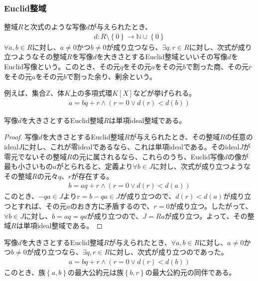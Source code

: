 \documentclass[dvipdfmx]{jsarticle}
\begin{document}
\subsubsection{Euclid整域}%
\begin{dfn} 整域$R$と次式のような写像$d$が与えられたとき、
\begin{align*}
d:R \setminus \left\{ 0 \right\} \rightarrow \mathbb{N} \cup \left\{ 0 \right\}
\end{align*}
$\forall a,b \in R$に対し、$a \neq 0$かつ$b \neq 0$が成り立つなら、$\exists q,r \in R$に対し、次式が成り立つようなその整域$R$を写像$d$を大きさとするEuclid整域といいその写像$d$をEuclid写像という。このとき、その元$q$をその元$a$をその元$b$で割った商、その元$r$をその元$a$をその元$b$で割った余り、剰余という。
\end{dfn}\par
例えば、集合$\mathbb{Z}$、体$K$上の多項式環$K[ X]$などが挙げられる。
\begin{align*}
a = bq + r \land \left( r = 0 \vee d(r) < d(b) \right)
\end{align*}
\begin{thm}\label{3.3.4.15}
写像$d$を大きさとするEuclid整域$R$は単項ideal整域である。
\end{thm}
\begin{proof}
写像$d$を大きさとするEuclid整域$R$が与えられたとき、その整域$R$の任意のideal$J$に対し、これが零idealであるなら、これは単項idealである。そのideal$J$が零元でないその整域$R$の元に属されるなら、これらのうち、Euclid写像$d$の像が最も小さいもの$a$がとられると、定義より$\forall b \in J$に対し、次式が成り立つようなその整域$R$の元々$q$、$r$が存在する。
\begin{align*}
b = aq + r \land \left( r = 0 \vee d(r) < d(a) \right)
\end{align*}
このとき、$- qa \in J$より$r = b - qa \in J$が成り立つので、$d(r) < d(a)$が成り立つとすれば、その元$a$のおき方に矛盾するので、$r = 0$が成り立つ。したがって、$\forall b \in J$に対し、$b = aq = qa$が成り立つので、$J = Ra$が成り立つ。よって、その整域$R$は単項ideal整域である。
\end{proof}
\begin{thm}\label{3.3.4.16}
写像$d$を大きさとするEuclid整域$R$が与えられたとき、$\forall a,b \in R$に対し、$a \neq 0$かつ$b \neq 0$が成り立つなら、$\exists q,r \in R$に対し、次式が成り立つのであった。
\begin{align*}
a = bq + r \land \left( r = 0 \vee d(r) < d(b) \right)
\end{align*}
このとき、族$\left\{ a,b \right\}$の最大公約元は族$\left\{ b,r \right\}$の最大公約元の同伴である。
\end{thm}
\end{document}
